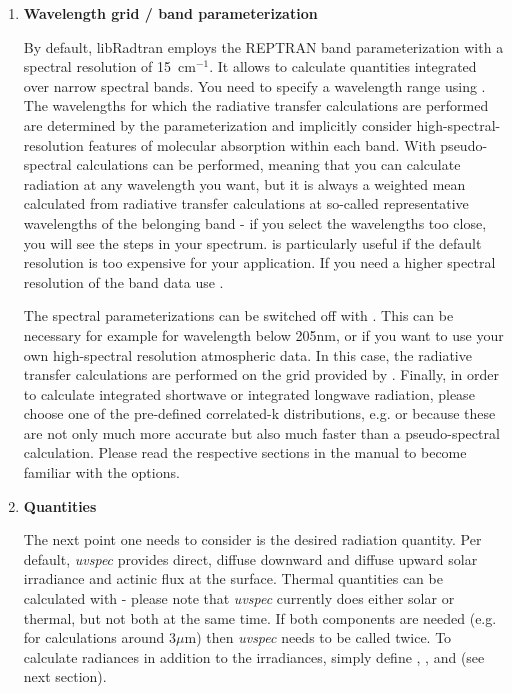 \begin{enumerate}

\item {\bf Wavelength grid / band parameterization}
 
  By default, libRadtran employs the REPTRAN band parameterization 
  with a spectral resolution of 15~cm$^{-1}$. It allows to calculate
  quantities integrated over narrow spectral bands. You need to
  specify a wavelength range using . 
  The wavelengths for which the radiative transfer calculations are performed are
  determined by the parameterization and implicitly consider 
  high-spectral-resolution features of molecular absorption within each band. 
  With  pseudo-spectral 
  calculations can be performed, meaning that you can calculate radiation 
  at any wavelength you want, but it is always a weighted mean calculated 
  from radiative transfer calculations at so-called representative 
  wavelengths of the belonging band - if you select the wavelengths too close, 
  you will see the steps in your spectrum.  is particularly useful
  if the default resolution is too expensive for your application.
  If you need a higher spectral resolution of the band data use 
  .

  The spectral parameterizations can be switched off with .
  This can be necessary for example for wavelength below 205nm, or 
  if you want to use your own high-spectral resolution atmospheric data.
  In this case, the radiative transfer calculations are performed on
  the grid provided by . 
  Finally, in order to calculate integrated
  shortwave or integrated longwave radiation, please choose one of the
  pre-defined correlated-k distributions, e.g. 
   or 
   because these are not only much more
  accurate but also much faster than a pseudo-spectral
  calculation. Please read the respective sections in the manual to
  become familiar with the  options.
  
\item {\bf Quantities}
  
  The next point one needs to consider is the desired radiation
  quantity. Per default, {\sl uvspec} provides direct, diffuse downward
  and diffuse upward solar irradiance and actinic flux at the
  surface. Thermal quantities can be calculated with  
   -
  please note that {\sl uvspec} currently does either solar or thermal,
  but not both at the same time. If both components are needed (e.g. for
  calculations around 3$\mu$m) then {\sl uvspec} needs to be called
  twice. To calculate radiances in addition to the irradiances, simply
  define , , and  (see next section).
  

\end{enumerate}
